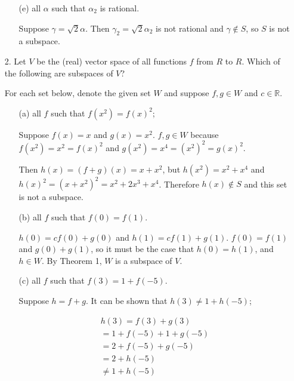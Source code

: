 \documentclass{article}
\begin{document}
\begin{enumerate}[listparindent=\parindent]
\begin{enumerate}[listparindent=\parindent]
        \item[(e)] all \(\alpha\) such that \(\alpha_2\) is rational.

            Suppose \(\gamma = \sqrt{2}\alpha\). Then \(\gamma_2 = \sqrt{2}\alpha_2\) is not rational
            and \(\gamma \notin S\), so \(S\) is not a subspace.

    \end{enumerate}
\item[2.] Let \(V\) be the (real) vector space of all functions \(f\) from \(R\) to \(R\).
    Which of the following are subspaces of \(V\)?

    For each set below, denote the given set \(W\) and suppose \(f, g \in W\) and \(c \in \mathbb{R}\).
    \begin{enumerate}[listparindent=\parindent]
        \item[(a)] all \(f\) such that \(f(x^2) = f(x)^2\);

            Suppose \(f(x) = x\) and \(g(x) = x^2\). \(f, g \in W\) because
            \(f(x^2) = x^2 = f(x)^2\) and \(g(x^2) = x^4 = (x^2)^2 = g(x)^2\).

            Then \(h(x) = (f + g)(x) = x + x^2\), but \(h(x^2) = x^2 + x^4\) and
            \(h(x)^2 = (x + x^2)^2 = x^2 + 2x^3 + x^4\). Therefore \(h(x) \notin S\)
            and this set is not a subspace.

        \item[(b)] all \(f\) such that \(f(0) = f(1)\).

            \(h(0) = cf(0) + g(0)\) and \(h(1) = cf(1) + g(1)\).
            \(f(0) = f(1)\) and \(g(0) + g(1)\), so it must be the case that \(h(0) = h(1)\),
            and \(h \in W\). By Theorem 1, \(W\) is a subspace of \(V\).

        \item[(c)] all \(f\) such that \(f(3) = 1 + f(-5)\).

            Suppose \(h = f + g\).
            It can be shown that \(h(3) \neq 1 + h(-5)\);

            \begin{gather*}
                h(3) = f(3) + g(3) \\
                = 1 + f(-5) + 1 + g(-5) \\
                = 2 + f(-5) + g(-5) \\
                = 2 + h(-5) \\
                \neq 1 + h(-5)
            \end{gather*}


\end{enumerate}
\end{enumerate}
\end{document}
